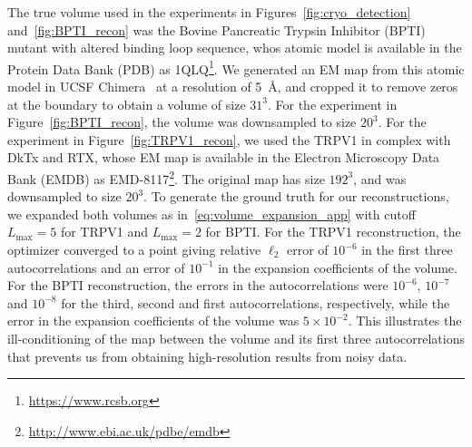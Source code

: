 \documentclass[12pt]{article}
\newcommand{\1}{\mathbf{1}}
\theoremstyle{plain}
\theoremstyle{definition}
\theoremstyle{remark}
\theoremstyle{plain}
\theoremstyle{remark}
\theoremstyle{plain}
\theoremstyle{plain}
\begin{document}
The true volume used in the experiments in Figures~\ref{fig:cryo_detection} and~\ref{fig:BPTI_recon} was the Bovine Pancreatic Trypsin Inhibitor (BPTI) mutant with altered binding loop sequence, whos atomic model is available in the Protein Data Bank (PDB)  
as 1QLQ\footnote{\url{https://www.rcsb.org}}. We generated an EM map from this atomic model in UCSF Chimera~\cite{pettersen2004ucsf} at a resolution of 5~\AA, and cropped it to remove zeros at the boundary to obtain a volume of size $31^3$. For the experiment in Figure~\ref{fig:BPTI_recon}, the volume was downsampled to size $20^3$. For the experiment in Figure~\ref{fig:TRPV1_recon}, we used the TRPV1 in complex with DkTx and RTX, whose EM map is available in the  Electron Microscopy Data Bank (EMDB) 
as EMD-8117\footnote{\url{http://www.ebi.ac.uk/pdbe/emdb}}. The original map has size $192^3$, and was downsampled to size $20^3$. To generate the ground truth for our reconstructions, we expanded both volumes as in~\eqref{eq:volume_expansion_app} with cutoff $L_{\text{max}} = 5$ for TRPV1 and $L_{\text{max}} = 2$ for BPTI. For the TRPV1 reconstruction, the optimizer converged to a point giving relative $\ell_2$ error of $10^{-6}$ in the first three autocorrelations and an error of $10^{-1}$ in the expansion coefficients of the volume. For the BPTI reconstruction, the errors in the autocorrelations were $10^{-6}$, $10^{-7}$ and $10^{-8}$ for the third, second and first autocorrelations, respectively, while the error in the expansion coefficients of the volume was $5\times 10^{-2}$. This illustrates the ill-conditioning of the map between the volume and its first three autocorrelations that prevents us from obtaining {high-resolution} results from noisy data.
\end{document}
